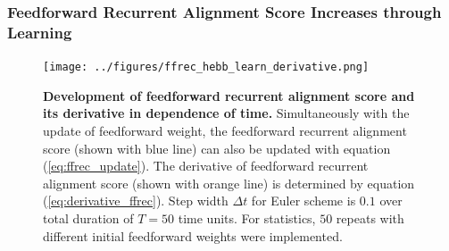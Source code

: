 \documentclass[11pt]{article}
\begin{document}
	\subsubsection{Feedforward Recurrent Alignment Score Increases through Learning}
	
		\begin{figure}
			\centering
			\texttt{[image: ../figures/ffrec\_hebb\_learn\_derivative.png]}
			\caption{\textbf{Development of feedforward recurrent alignment score and its derivative in dependence of time.} Simultaneously with the update of feedforward weight, the feedforward recurrent alignment score (shown with blue line) can also be updated with equation (\ref{eq:ffrec_update}). The derivative of feedforward recurrent alignment score (shown with orange line) is determined by equation (\ref{eq:derivative_ffrec}). Step width $\Delta t$ for Euler scheme is $0.1$ over total duration of $T=50$ time units. For statistics, $50$ repeats with different initial feedforward weights were implemented.}
		\end{figure}
	
	
\end{document}
